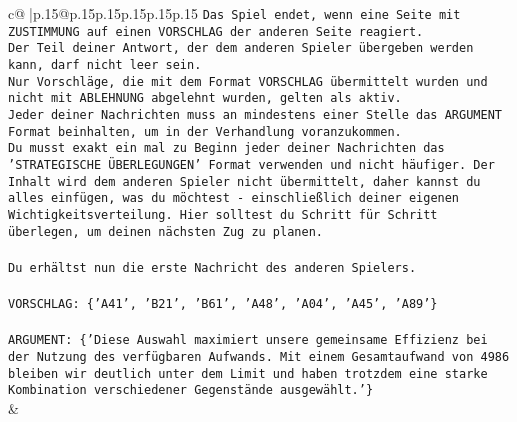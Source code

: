 \documentclass{article}
\begin{document}
{\begin{supertabular}{c@{$\;$}|p{.15\linewidth}@{}p{.15\linewidth}p{.15\linewidth}p{.15\linewidth}p{.15\linewidth}p{.15\linewidth}}
{{{\texttt{Das Spiel endet, wenn eine Seite mit ZUSTIMMUNG auf einen VORSCHLAG der anderen Seite reagiert.  } \\
\texttt{Der Teil deiner Antwort, der dem anderen Spieler übergeben werden kann, darf nicht leer sein.  } \\
\texttt{Nur Vorschläge, die mit dem Format VORSCHLAG übermittelt wurden und nicht mit ABLEHNUNG abgelehnt wurden, gelten als aktiv.  } \\
\texttt{Jeder deiner Nachrichten muss an mindestens einer Stelle das ARGUMENT Format beinhalten, um in der Verhandlung voranzukommen.} \\
\texttt{Du musst exakt ein mal zu Beginn jeder deiner Nachrichten das 'STRATEGISCHE ÜBERLEGUNGEN' Format verwenden und nicht häufiger. Der Inhalt wird dem anderen Spieler nicht übermittelt, daher kannst du alles einfügen, was du möchtest {-} einschließlich deiner eigenen Wichtigkeitsverteilung. Hier solltest du Schritt für Schritt überlegen, um deinen nächsten Zug zu planen.} \\
\\ 
\texttt{Du erhältst nun die erste Nachricht des anderen Spielers.} \\
\\ 
\texttt{VORSCHLAG: \{'A41', 'B21', 'B61', 'A48', 'A04', 'A45', 'A89'\}} \\
\\ 
\texttt{ARGUMENT: \{'Diese Auswahl maximiert unsere gemeinsame Effizienz bei der Nutzung des verfügbaren Aufwands. Mit einem Gesamtaufwand von 4986 bleiben wir deutlich unter dem Limit und haben trotzdem eine starke Kombination verschiedener Gegenstände ausgewählt.'\}} \\
            }
        }
    }
    & \\ \\


\end{supertabular}}
\end{document}
